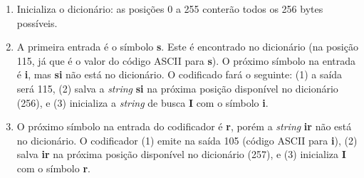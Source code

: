 \begin{frame}[allowframebreaks]
  \framebreak

  \begin{enumerate}
  \item Inicializa o dicionário: as posições 0 a 255 conterão todos os 256 bytes possíveis.
  \item A primeira entrada é o símbolo \textbf{s}. Este é encontrado no dicionário (na posição 115, já que 
        é o valor do código ASCII para \textbf{s}). O próximo símbolo na entrada é \textbf{i}, mas
        \textbf{si} não está no dicionário. O codificado fará o seguinte: (1) a saída será 115,
        (2) salva a \textit{string} \textbf{si} na próxima posição disponível no dicionário (256),
        e (3) inicializa a \textit{string} de busca \textbf{I} com o símbolo \textbf{i}.
   \item O próximo símbolo na entrada do codificador é \textbf{r}, porém a \textit{string} \textbf{ir} 
        não está no dicionário. O codificador (1) emite na saída 105 (código ASCII para \textbf{i}),
        (2) salva \textbf{ir} na próxima posição disponível no dicionário (257), e (3) inicializa
        \textbf{I} com o símbolo \textbf{r}.
   \end{enumerate}

   \framebreak


\end{frame}
